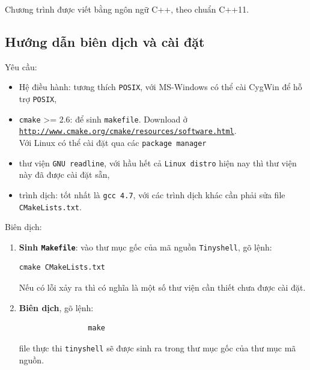 \documentclass[a4paper,12pt]{report}
\begin{document}
        Chương trình được viết bằng ngôn ngữ C++, theo chuẩn C++11.

        \subsection{Hướng dẫn biên dịch và cài đặt}
        Yêu cầu:
        \begin{itemize}
            \item Hệ điều hành: tương thích \texttt{POSIX}, với MS-Windows có thể cài
                CygWin để hỗ trợ \texttt{POSIX},
            \item \texttt{cmake} >= 2.6: để sinh \texttt{makefile}. Download ở \\
                \href{http://www.cmake.org/cmake/resources/software.html}{\texttt{http://www.cmake.org/cmake/resources/software.html}}.\\
                Với Linux có thể cài đặt qua các \texttt{package manager}
            \item thư viện \texttt{GNU readline}, với hầu hết cả \texttt{Linux
                distro} hiện nay thì thư viện này đã được cài đặt sẵn,
            \item trình dịch: tốt nhất là \texttt{gcc 4.7}, với các trình dịch
                khác cần phải sửa file \texttt{CMakeLists.txt}.
        \end{itemize}

        Biên dịch:
        \begin{enumerate}
            \item \textbf{Sinh \texttt{Makefile}}: vào thư mục gốc của mã nguồn
                \texttt{Tinyshell}, gõ lệnh:
                \begin{verbatim}
cmake CMakeLists.txt
                \end{verbatim}
                Nếu có lỗi xảy ra thì có nghĩa là một số thư viện cần thiết
                chưa được cài đặt.
            \item \textbf{Biên dịch}, gõ lệnh:
                \begin{verbatim}
                make
                \end{verbatim}
                file thực thi \texttt{tinyshell} sẽ được sinh ra trong thư mục
                gốc của thư mục mã nguồn.
        \end{enumerate}

\end{document}
